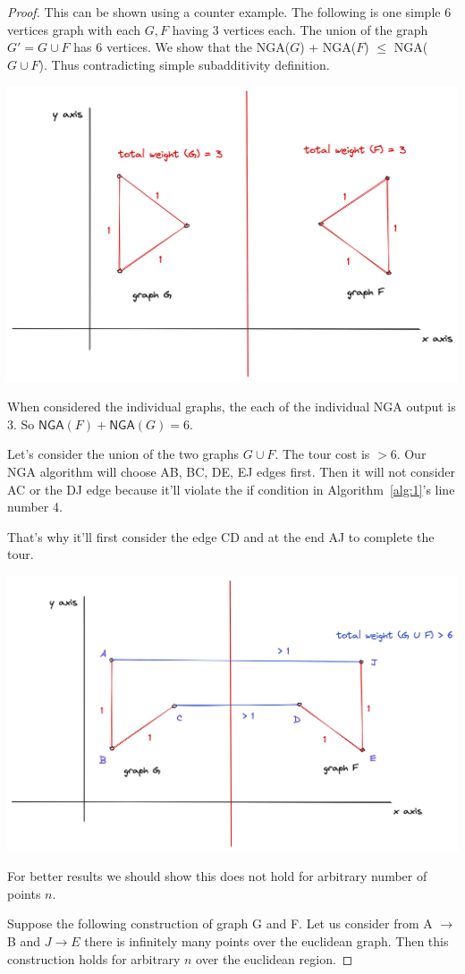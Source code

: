 \documentclass{article}
\theoremstyle{define}
\theoremstyle{remark}
\begin{document}
\begin{proof}
    This can be shown using a counter example.
    The following is one simple $6$ vertices graph with each $G, F$ having 3
    vertices each. The union of the graph $G' = G \cup F$ has $6$ vertices. We
    show that the \textsf{NGA}($G$) + \textsf{NGA}($F$) $\leq$
    \textsf{NGA}($G \cup F$). Thus contradicting simple subadditivity definition.

    \includegraphics[scale=0.13]{non-subadditive.png}

    When considered the individual graphs, the each of the individual \textsf{NGA} output is 3.
    So $\textsf{NGA}(F) + \textsf{NGA}(G) = 6$.

    Let's consider the union of the two graphs $G \cup F$. The tour cost is $> 6$.
    Our \textsf{NGA} algorithm will choose AB, BC, DE, EJ edges first. Then it will not
    consider AC or the DJ edge because it'll violate the if condition in Algorithm~\ref{alg:1}'s line number 4.

    That's why it'll first consider the edge CD and at the end AJ to complete the tour.

    \includegraphics[scale=0.13]{non-subadditive2.png}

    For better results we should show this does not hold for arbitrary number of points $n$.
    
    Suppose the following construction of graph G and F. Let us consider from A $\to $ B and $J \to E$ there
    is infinitely many points over the euclidean graph. Then this construction holds for arbitrary $n$ over the euclidean
    region.
\end{proof}
\end{document}
